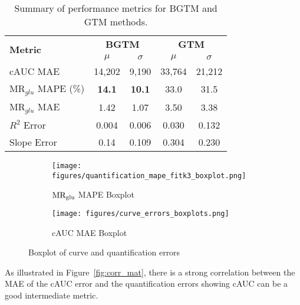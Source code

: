 \begin{table}[h]
	\centering
	\begin{tabular}{l|cc|cc}
		\toprule
		\multirow{2}{*}{\textbf{Metric}} & \multicolumn{2}{c|}{\textbf{BGTM}} & \multicolumn{2}{c}{\textbf{GTM}}                        \\
		\cmidrule(lr){2-3} \cmidrule(lr){4-5}
		                                 & \(\mu\)                            & \(\sigma\)                       & \(\mu\) & \(\sigma\) \\
		\midrule
		cAUC MAE                         & 14,202                             & 9,190                            & 33,764  & 21,212     \\
		\(\textrm{MR}_{glu}\) MAPE (\%)  & \textbf{14.1}                      & \textbf{10.1}                    & 33.0    & 31.5       \\
		\(\textrm{MR}_{glu}\) MAE        & 1.42                               & 1.07                             & 3.50    & 3.38       \\
		\(R^2\) Error                    & 0.004                              & 0.006                            & 0.030   & 0.132      \\
		Slope Error                      & 0.14                               & 0.109                            & 0.304   & 0.230      \\
		\bottomrule
	\end{tabular}
	\caption{Summary of performance metrics for BGTM and GTM methods.}
	\label{tab:metrics}
\end{table}

\begin{figure}[h]
	\centering
	\begin{subfigure}[b]{0.45\textwidth}
		\texttt{[image: figures/quantification\_mape\_fitk3\_boxplot.png]}
		\caption{\(\text{MR}_{\text{glu}}\) MAPE Boxplot}
		\label{subfig:fitk3_mape}
	\end{subfigure}
	\begin{subfigure}[b]{0.45\textwidth}
		\texttt{[image: figures/curve\_errors\_boxplots.png]}
		\caption{cAUC MAE Boxplot}
		\label{subfig:curve_errors_boxplot}
	\end{subfigure}
	\label{fig:boxplots}
	\caption{Boxplot of curve and quantification errors}
\end{figure}

As illustrated in Figure~\ref{fig:corr_mat}, there is a strong correlation between the MAE of the cAUC error and the quantification errors showing cAUC can be a good intermediate metric.

